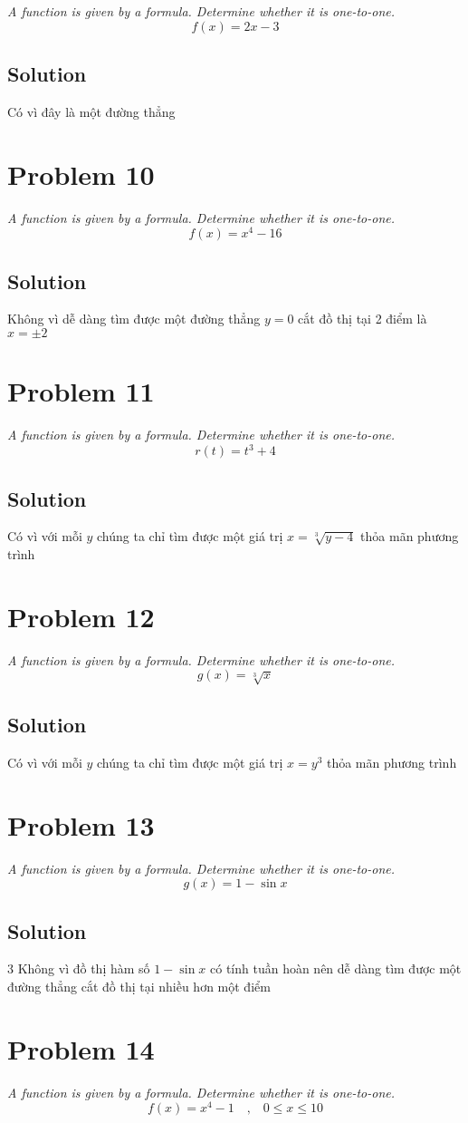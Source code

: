 \documentclass[11pt]{article}
\newcommand{\soln}{\subsection*}
\newcommand{\qn}{\textit}
\newcommand{\eqtext}[1]{\quad\text{#1}\quad}
\begin{document}
\qn{A function is given by a formula. Determine whether it is one-to-one. $$f(x)=2x-3$$}

\soln{Solution}
Có vì đây là một đường thẳng

\section*{Problem 10}

\qn{A function is given by a formula. Determine whether it is one-to-one. $$f(x)=x^4-16$$}

\soln{Solution}
Không vì dễ dàng tìm được một đường thẳng $y=0$ cắt đồ thị tại 2 điểm là $x=\pm 2$

\section*{Problem 11}

\qn{A function is given by a formula. Determine whether it is one-to-one. $$r(t)=t^3+4$$}

\soln{Solution}
Có vì với mỗi $y$ chúng ta chỉ tìm được một giá trị $x=\sqrt[3]{y-4}$ thỏa mãn phương trình

\section*{Problem 12}

\qn{A function is given by a formula. Determine whether it is one-to-one. $$g(x)=\sqrt[3]{x}$$}

\soln{Solution}
Có vì với mỗi $y$ chúng ta chỉ tìm được một giá trị $x=y^3$ thỏa mãn phương trình

\section*{Problem 13}

\qn{A function is given by a formula. Determine whether it is one-to-one. $$g(x)=1-\sin{x}$$}

\soln{Solution}3
Không vì đồ thị hàm số $1-\sin{x}$ có tính tuần hoàn nên dễ dàng tìm được một đường thẳng cắt đồ thị tại nhiều hơn một điểm

\section*{Problem 14}

\qn{A function is given by a formula. Determine whether it is one-to-one. $$f(x)=x^4-1 \eqtext{,} 0 \le x \le 10$$}
\end{document}
